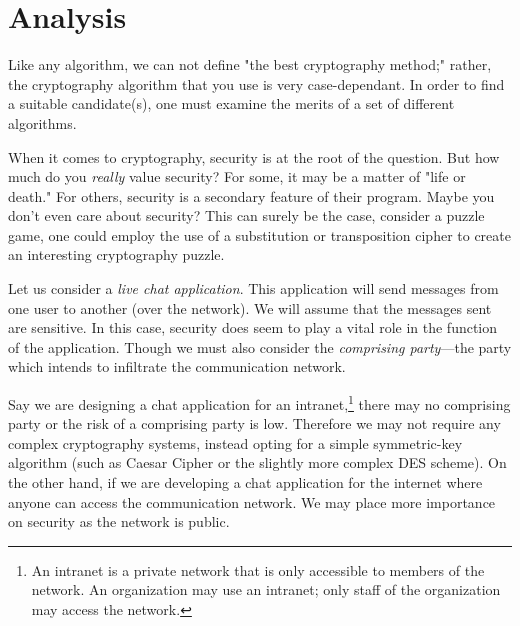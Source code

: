 \chapter{Analysis}
\label{Analysis}

Like any algorithm, we can not define "the best cryptography method;" rather, the cryptography algorithm that you use is 
very case-dependant. In order to find a suitable candidate(s), one must examine the merits of a set of different algorithms.

When it comes to cryptography, security is at the root of the question. But how much do you \textit{really} value security?
For some, it may be a matter of "life or death." For others, security is a secondary feature of their program. Maybe you don't
even care about security? This can surely be the case, consider a puzzle game, one could employ the use of a substitution or 
transposition cipher to create an interesting cryptography puzzle.

Let us consider a \textit{live chat application}. This application will send messages from one user to another (over the network).
We will assume that the messages sent are sensitive. In this case, security does seem to play a vital role in the function
of the application. Though we must also consider the \textit{comprising party}---the party which intends to infiltrate the 
communication network. 

Say we are designing a chat application for an intranet,\footnote{An intranet is a private network that is only accessible to
members of the network. An organization may use an intranet; only staff of the organization may access the network.} there may 
no comprising party or the risk of a comprising party is low. Therefore we may not require any complex cryptography systems, 
instead opting for a simple symmetric-key algorithm (such as Caesar Cipher or the slightly more complex DES scheme). On the 
other hand, if we are developing a chat application for the internet where anyone can access the communication network. We may
place more importance on security as the network is public.

